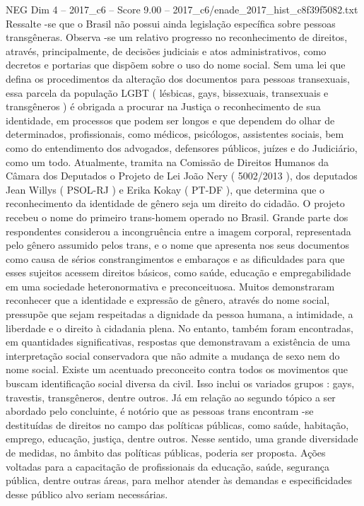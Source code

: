 \begin{textsample}{NEG Dim 4 – 2017\_c6 – Score 9.00 – 2017\_c6/enade\_2017\_hist\_c8f39f5082.txt}
Ressalte -se que o Brasil não possui ainda legislação específica sobre pessoas transgêneras.
Observa -se um relativo progresso no reconhecimento de direitos, através, principalmente, de decisões judiciais e atos administrativos, como decretos e portarias que dispõem sobre o uso do nome social.
Sem uma lei que defina os procedimentos da alteração dos documentos para pessoas transexuais, essa parcela da população LGBT ( lésbicas, gays, bissexuais, transexuais e transgêneros ) é obrigada a procurar na Justiça o reconhecimento de sua identidade, em processos que podem ser longos e que dependem do olhar de determinados, profissionais, como médicos, psicólogos, assistentes sociais, bem como do entendimento dos advogados, defensores públicos, juízes e do Judiciário, como um todo.
Atualmente, tramita na Comissão de Direitos Humanos da Câmara dos Deputados o Projeto de Lei João Nery ( 5002/2013 ), dos deputados Jean Willys ( PSOL-RJ ) e Erika Kokay ( PT-DF ), que determina que o reconhecimento da identidade de gênero seja um direito do cidadão.
O projeto recebeu o nome do primeiro trans-homem operado no Brasil.
Grande parte dos respondentes considerou a incongruência entre a imagem corporal, representada pelo gênero assumido pelos trans, e o nome que apresenta nos seus documentos como causa de sérios constrangimentos e embaraços e as dificuldades para que esses sujeitos acessem direitos básicos, como saúde, educação e empregabilidade em uma sociedade heteronormativa e preconceituosa.
Muitos demonstraram reconhecer que a identidade e expressão de gênero, através do nome social, pressupõe que sejam respeitadas a dignidade da pessoa humana, a intimidade, a liberdade e o direito à cidadania plena.
No entanto, também foram encontradas, em quantidades significativas, respostas que demonstravam a existência de uma interpretação social conservadora que não admite a mudança de sexo nem do nome social.
Existe um acentuado preconceito contra todos os movimentos que buscam identificação social diversa da civil.
Isso inclui os variados grupos : gays, travestis, transgêneros, dentre outros.
Já em relação ao segundo tópico a ser abordado pelo concluinte, é notório que as pessoas trans encontram -se destituídas de direitos no campo das políticas públicas, como saúde, habitação, emprego, educação, justiça, dentre outros.
Nesse sentido, uma grande diversidade de medidas, no âmbito das políticas públicas, poderia ser proposta.
Ações voltadas para a capacitação de profissionais da educação, saúde, segurança pública, dentre outras áreas, para melhor atender às demandas e especificidades desse público alvo seriam necessárias.

\end{textsample}
